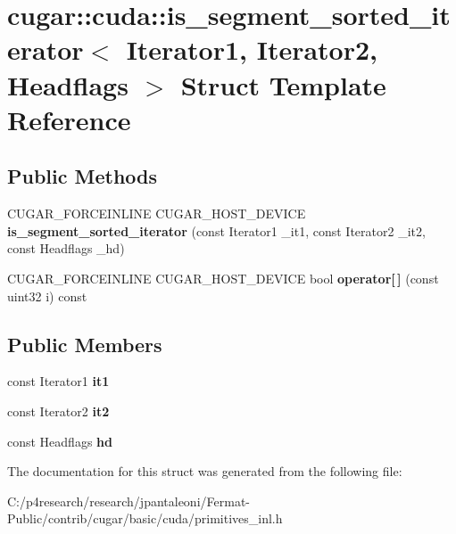 \hypertarget{structcugar_1_1cuda_1_1is__segment__sorted__iterator}{}\section{cugar\+:\+:cuda\+:\+:is\+\_\+segment\+\_\+sorted\+\_\+iterator$<$ Iterator1, Iterator2, Headflags $>$ Struct Template Reference}
\label{structcugar_1_1cuda_1_1is__segment__sorted__iterator}
\subsection*{Public Methods}
\begin{DoxyCompactItemize}
\item 
\mbox{\label{structcugar_1_1cuda_1_1is__segment__sorted__iterator_a480e08ed16ff7d8e5cf70bc46e0db8f8}} 
C\+U\+G\+A\+R\+\_\+\+F\+O\+R\+C\+E\+I\+N\+L\+I\+NE C\+U\+G\+A\+R\+\_\+\+H\+O\+S\+T\+\_\+\+D\+E\+V\+I\+CE {\bfseries is\+\_\+segment\+\_\+sorted\+\_\+iterator} (const Iterator1 \+\_\+it1, const Iterator2 \+\_\+it2, const Headflags \+\_\+hd)
\item 
\mbox{\label{structcugar_1_1cuda_1_1is__segment__sorted__iterator_a7577bb0170f2b79568b5a174ce5f6581}} 
C\+U\+G\+A\+R\+\_\+\+F\+O\+R\+C\+E\+I\+N\+L\+I\+NE C\+U\+G\+A\+R\+\_\+\+H\+O\+S\+T\+\_\+\+D\+E\+V\+I\+CE bool {\bfseries operator\mbox{[}$\,$\mbox{]}} (const uint32 i) const
\end{DoxyCompactItemize}
\subsection*{Public Members}
\begin{DoxyCompactItemize}
\item 
\mbox{\label{structcugar_1_1cuda_1_1is__segment__sorted__iterator_a77c9181ead65806dd389980c8304a964}} 
const Iterator1 {\bfseries it1}
\item 
\mbox{\label{structcugar_1_1cuda_1_1is__segment__sorted__iterator_a4381ebc2dc4c0bd1a46ffa8ff42ea7e2}} 
const Iterator2 {\bfseries it2}
\item 
\mbox{\label{structcugar_1_1cuda_1_1is__segment__sorted__iterator_abf50890e0a36a959edf214fdb74495cd}} 
const Headflags {\bfseries hd}
\end{DoxyCompactItemize}


The documentation for this struct was generated from the following file\+:\begin{DoxyCompactItemize}
\item 
C\+:/p4research/research/jpantaleoni/\+Fermat-\/\+Public/contrib/cugar/basic/cuda/primitives\+\_\+inl.\+h\end{DoxyCompactItemize}
